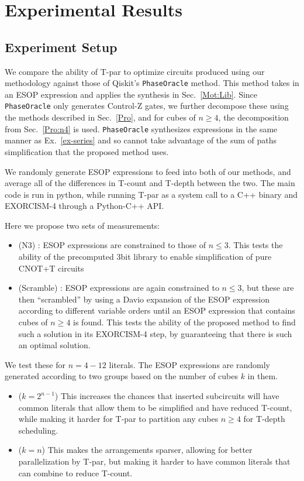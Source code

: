 \section{Experimental Results}
\label{Exp}
\subsection{Experiment Setup}
\label{Exp:Set}
We compare the ability of T-par to optimize circuits produced using our methodology against those of
Qiskit's \texttt{PhaseOracle} method. This method takes in an ESOP expression and applies the synthesis in
Sec.~\ref{Mot:Lib}. Since \texttt{PhaseOracle} only generates Control-Z gates,
we further decompose these using the methods described in Sec.~\ref{Pro}, and for cubes of $n \geq 4$,
the decomposition from Sec.~\ref{Pro:n4} is used. \texttt{PhaseOracle} synthesizes expressions in the same
manner as Ex.~\ref{ex-series} and so cannot take advantage of the sum of paths simplification that
the proposed method uses.

We randomly generate ESOP expressions to feed into both of our methods, and average all
of the differences in T-count and T-depth between the two. The main code is run in python, while running
T-par as a system call to a C++ binary and EXORCISM-4 through a Python-C++ API.

Here we propose two sets of measurements:

\begin{itemize}
\item (N3) : ESOP expressions are constrained to those of $n \leq 3$. This tests the ability of the
  precomputed 3bit library to enable simplification of pure CNOT+T circuits
\item (Scramble) : ESOP expressions are again constrained to $n \leq 3$, but these are then ``scrambled''
  by using a Davio expansion of the ESOP expression according to different variable orders until an ESOP expression
  that contains cubes of $n \geq 4$ is found. This tests the ability of the proposed method to find such a
  solution in its EXORCISM-4 step, by guaranteeing that there is such an optimal solution.
\end{itemize}

We test these for $n=4-12$ literals. The ESOP expressions are randomly generated according to two groups
based on the number of cubes $k$ in them.

\begin{itemize}
\item ($k=2^{n-1}$) This increases the chances that inserted subcircuits will have common literals that allow them
  to be simplified and have reduced T-count, while making it harder for T-par to partition any cubes $n \geq 4$
  for T-depth scheduling.
\item ($k=n$) This makes the arrangements sparser, allowing for better parallelization by T-par, but making
  it harder to have common literals that can combine to reduce T-count.
\end{itemize}

